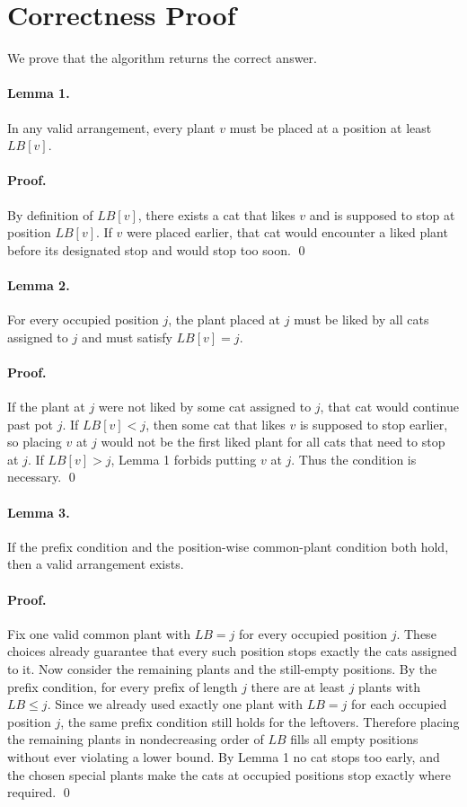 \documentclass[11pt]{article}
\begin{document}
\section*{Correctness Proof}

We prove that the algorithm returns the correct answer.

\paragraph{Lemma 1.}
In any valid arrangement, every plant $v$ must be placed at a position at least $LB[v]$.

\paragraph{Proof.}
By definition of $LB[v]$, there exists a cat that likes $v$ and is supposed to stop at position $LB[v]$.
If $v$ were placed earlier, that cat would encounter a liked plant before its designated stop and would
stop too soon. \qed

\paragraph{Lemma 2.}
For every occupied position $j$, the plant placed at $j$ must be liked by all cats assigned to $j$ and must
satisfy $LB[v]=j$.

\paragraph{Proof.}
If the plant at $j$ were not liked by some cat assigned to $j$, that cat would continue past pot $j$.
If $LB[v] < j$, then some cat that likes $v$ is supposed to stop earlier, so placing $v$ at $j$ would not be
the first liked plant for all cats that need to stop at $j$.
If $LB[v] > j$, Lemma 1 forbids putting $v$ at $j$. Thus the condition is necessary. \qed

\paragraph{Lemma 3.}
If the prefix condition and the position-wise common-plant condition both hold, then a valid arrangement
exists.

\paragraph{Proof.}
Fix one valid common plant with $LB=j$ for every occupied position $j$.
These choices already guarantee that every such position stops exactly the cats assigned to it.
Now consider the remaining plants and the still-empty positions.
By the prefix condition, for every prefix of length $j$ there are at least $j$ plants with $LB \le j$.
Since we already used exactly one plant with $LB=j$ for each occupied position $j$, the same prefix
condition still holds for the leftovers.
Therefore placing the remaining plants in nondecreasing order of $LB$ fills all empty positions without
ever violating a lower bound. By Lemma 1 no cat stops too early, and the chosen special plants make the
cats at occupied positions stop exactly where required. \qed
\end{document}
